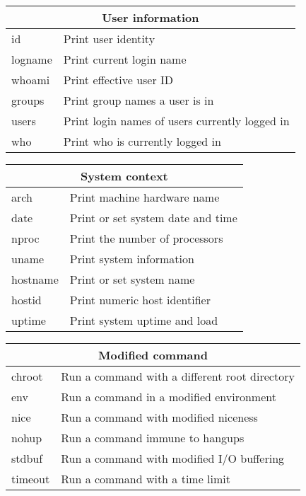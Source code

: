 \begin{tabularx}{0.75\textwidth}{|l|X|}
\hline
\multicolumn{2}{|c|}{User information}\\ \hline
id  &                 Print user identity\\
logname  &            Print current login name\\
whoami  &             Print effective user ID\\
groups  &             Print group names a user is in\\
users  &              Print login names of users currently logged in\\
who  &                Print who is currently logged in\\
\hline
\end{tabularx}

\begin{tabularx}{0.75\textwidth}{|l|X|}
\hline
\multicolumn{2}{|c|}{System context}\\ \hline
arch  &               Print machine hardware name\\
date  &               Print or set system date and time\\
nproc  &              Print the number of processors\\
uname  &              Print system information\\
hostname  &           Print or set system name\\
hostid  &             Print numeric host identifier\\
uptime  &             Print system uptime and load\\
\hline
\end{tabularx}

\begin{tabularx}{0.75\textwidth}{|l|X|}
\hline
\multicolumn{2}{|c|}{Modified command}\\ \hline
chroot  &             Run a command with a different root directory\\
env  &                Run a command in a modified environment\\
nice  &               Run a command with modified niceness\\
nohup  &              Run a command immune to hangups\\
stdbuf  &             Run a command with modified I/O buffering\\
timeout  &            Run a command with a time limit\\
\hline
\end{tabularx}

